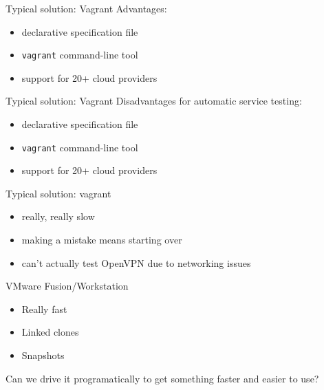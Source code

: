 \documentclass[xcolor=svgnames,17pt]{beamer}
\begin{document}
\begin{frame}{Typical solution: Vagrant}
Advantages:
\begin{itemize}
\item declarative specification file
\item \texttt{vagrant} command-line tool
\item support for 20+ cloud providers
\end{itemize}
\end{frame}

\begin{frame}{Typical solution: Vagrant}
Disadvantages for automatic service testing:
\begin{itemize}
\item declarative specification file
\item \texttt{vagrant} command-line tool
\item support for 20+ cloud providers
\end{itemize}
\end{frame}

\begin{frame}{Typical solution: vagrant}
\begin{itemize}
\item really, really slow
\item making a mistake means starting over
\item can’t actually test OpenVPN due to networking issues
\end{itemize}
\end{frame}

\begin{frame}{VMware Fusion/Workstation}
\begin{itemize}
\item Really fast
\item Linked clones
\item Snapshots
\end{itemize}
\pause
Can we drive it programatically to get something faster and easier to use?
\end{frame}
\end{document}
